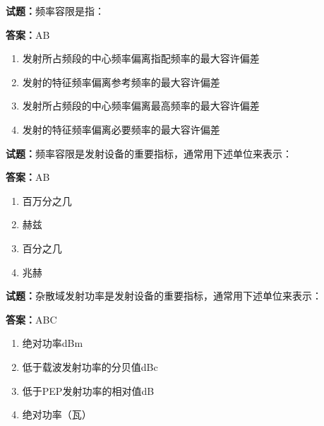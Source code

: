\documentclass{ctexbook}
\begin{document}




\vspace{1em}

\textbf{试题：}频率容限是指： 

\textbf{答案：}AB 

\begin{enumerate}[leftmargin=3em]
  \item 发射所占频段的中心频率偏离指配频率的最大容许偏差 

  \item 发射的特征频率偏离参考频率的最大容许偏差 


  \item 发射所占频段的中心频率偏离最高频率的最大容许偏差 

  \item 发射的特征频率偏离必要频率的最大容许偏差 

\end{enumerate}





\vspace{1em}

\textbf{试题：}频率容限是发射设备的重要指标，通常用下述单位来表示： 

\textbf{答案：}AB 

\begin{enumerate}[leftmargin=3em]
  \item 百万分之几 

  \item 赫兹 

  \item 百分之几 

  \item 兆赫 

\end{enumerate}





\vspace{1em}

\textbf{试题：}杂散域发射功率是发射设备的重要指标，通常用下述单位来表示： 

\textbf{答案：}ABC 

\begin{enumerate}[leftmargin=3em]
  \item 绝对功率dBm 

  \item 低于载波发射功率的分贝值dBc 

  \item 低于PEP发射功率的相对值dB 

  \item 绝对功率（瓦） 

\end{enumerate}
\end{document}
